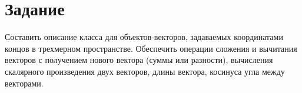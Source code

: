 \label{sec:task}
\section{Задание}

Составить описание класса для объектов-векторов, задаваемых координатами концов в трехмерном пространстве. Обеспечить операции сложения и вычитания векторов с получением нового вектора (суммы или разности), вычисления скалярного произведения двух векторов, длины вектора, косинуса угла между векторами.
